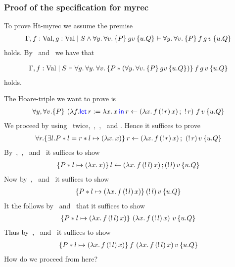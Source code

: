\subsubsection*{Proof of the specification for myrec}
To prove Ht-myrec we assume the premise
\begin{align}
\label{myrec_1}
\Gamma, f:\Val, g : \Val \mid S \land \All y . \All v. \hoare{P}{g v}{u.Q } \proves \All y . \All v. \hoare{P} {f\, g\, v} {u.Q}
\end{align} 
holds.
By~ and~ we have that

\begin{align}
\label{myrec_2}
\Gamma, f:\Val \mid S\proves \All g. \All y . \All v. \hoare{P \ast \left( \All y . \All v. \hoare{P}{g v}{u.Q }\right)} {f\, g\, v} {u.Q}
\end{align}
holds.

The Hoare-triple we want to prove is
\begin{align*}
\forall y, \forall v. \hoare{P}{
 \left( \lambda f. \Let r = \lambda x. \, x  in 
      r \gets \left( \lambda x.\, f \, (\deref{r})\, x \right); \ \deref{r} \right) \, f \, v
      }{u.Q}
\end{align*}
We proceed by using~ twice,~,~,~ and . Hence it suffices to prove
\begin{align*}
\forall r. \hoare{\exists l. P * l=r * l \pointsto \left( \lambda x. \, x \right)}{ r \gets \left(\lambda x.\, f \, (\deref{r})\, x\right) ;\ (\deref{r}) \, v}{u.Q}
\end{align*}
By~,~,~ and~ it suffices to show
\begin{align*}
\hoare{P * l \pointsto \left( \lambda x. \, x \right)}{ l\gets \left( \lambda x.\, f \, (\deref{l})\, x\right) ; (\deref{l})  \, v}{u.Q}
\end{align*}
Now by~,~ and~ it suffices to show
\begin{align*}
\hoare{P * l \pointsto \left(\lambda x.\, f \, (\deref{l})\, x  \right)}{(\deref{l}) \, v}{u.Q}
\end{align*}
It the follows by~ and~ that it suffices to show
\begin{align}
\hoare{P * l \pointsto \left(\lambda x.\, f \, (\deref{l})\, x  \right)}{\left(\lambda x.\, f \, (\deref{l})\, x  \right) \, v}{u.Q}
\label{myrec_lob1}
\end{align}
Thus by~,~ and~ it suffices to show
\begin{align}
\hoare{P * l \pointsto \left(\lambda x.\, f \, (\deref{l})\, x  \right)}{f \, \left(\lambda x.\, f \, (\deref{l)}\, x  \right) v}{u.Q}
\label{myrec_lob2}
\end{align}
How do we proceed from here?

